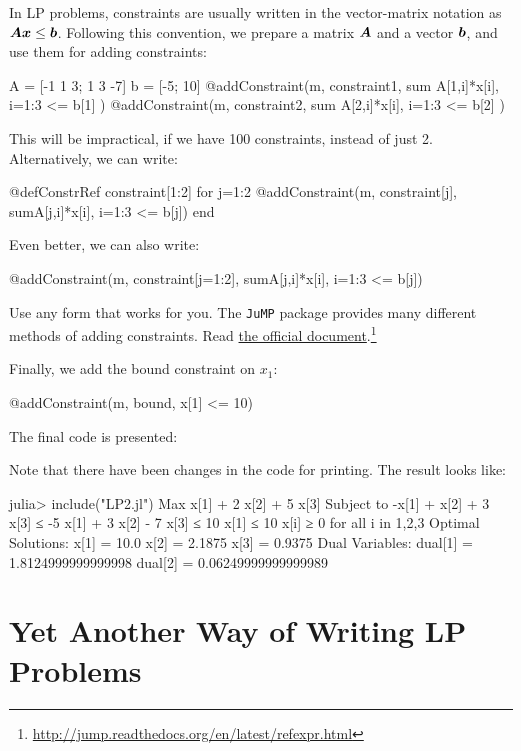 In LP problems, constraints are usually written in the vector-matrix notation as $	\boldsymbol{A} \boldsymbol{x} \leq \boldsymbol{b} $. Following this convention, we prepare a matrix $\boldsymbol{A}$ and a vector $\boldsymbol{b}$, and use them for adding constraints:
\begin{code}
A = [-1  1  3;
      1  3 -7]
b = [-5; 10]
@addConstraint(m, constraint1, sum{ A[1,i]*x[i], i=1:3} <= b[1] )
@addConstraint(m, constraint2, sum{ A[2,i]*x[i], i=1:3} <= b[2] )
\end{code}
\noindent This will be impractical, if we have 100 constraints, instead of just 2. Alternatively, we can write:
\begin{code}
@defConstrRef constraint[1:2]
for j=1:2
    @addConstraint(m, constraint[j], sum{A[j,i]*x[i], i=1:3} <= b[j])
end
\end{code}
\noindent Even better, we can also write:
\begin{code}
@addConstraint(m, constraint[j=1:2], sum{A[j,i]*x[i], i=1:3 } <= b[j])
\end{code}
\noindent Use any form that works for you. The \texttt{JuMP} package provides many different methods of adding constraints. Read \href{http://jump.readthedocs.org/en/latest/refexpr.html}{the official document}.\footnote{\url{http://jump.readthedocs.org/en/latest/refexpr.html}}

Finally, we add the bound constraint on $x_1$:
\begin{code}
@addConstraint(m, bound, x[1] <= 10)
\end{code}

The final code is presented:
\begin{codelisting}
\end{codelisting}

Note that there have been changes in the code for printing. The result looks like:
\begin{code}
julia> include("LP2.jl")
Max x[1] + 2 x[2] + 5 x[3]
Subject to
 -x[1] + x[2] + 3 x[3] ≤ -5
 x[1] + 3 x[2] - 7 x[3] ≤ 10
 x[1] ≤ 10
 x[i] ≥ 0 for all i in {1,2,3}
Optimal Solutions:
x[1] = 10.0
x[2] = 2.1875
x[3] = 0.9375
Dual Variables:
dual[1] = 1.8124999999999998
dual[2] = 0.06249999999999989
\end{code}



\section{Yet Another Way of Writing LP Problems}

